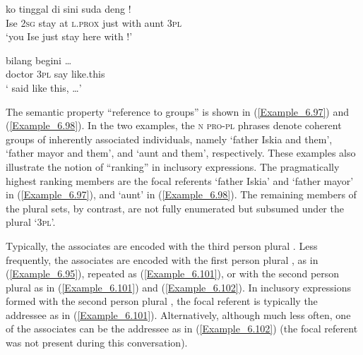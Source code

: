 \ea
\label{Example_6.98}
 {ko} {tinggal} {di} {sini} {suda} {deng} {} {!}\\ %
 Ise  \textsc{2sg}  stay  at  \textsc{l.prox}  just  with  aunt  \textsc{3pl}\\

\glt
‘you Ise just stay here with !’ \textstyleExampleSource{[080917-008-NP.0026]}
\z

\ea
\label{Example_6.99}
 {} {bilang} {begini} {\ldots}\\ %
 doctor  \textsc{3pl}  say  like.this  \\

\glt
‘ said like this, {\ldots}’ \textstyleExampleSource{[081015-005-NP.0047]}
\z


The semantic property “reference to groups” is shown in (\ref{Example_6.97}) and (\ref{Example_6.98}). In the two examples, the \textsc{n} \textsc{pro-pl}  phrases denote coherent groups of inherently associated individuals, namely  ‘father Iskia and them’,  ‘father mayor and them’, and  ‘aunt and them’, respectively. These examples also illustrate the notion of “ranking” in  inclusory expressions. The pragmatically highest ranking members are the focal referents  ‘father Iskia’ and  ‘father mayor’ in (\ref{Example_6.97}), and  ‘aunt’ in (\ref{Example_6.98}). The remaining members of the plural sets, by contrast, are not fully enumerated but subsumed under the plural   ‘3\textsc{pl}’.



Typically, the associates are encoded with the third person plural . Less frequently, the associates are encoded with the first person plural , as in (\ref{Example_6.95}), repeated as (\ref{Example_6.101}), or with the second person plural  as in (\ref{Example_6.101}) and (\ref{Example_6.102}). In  inclusory expressions formed with the second person plural , the focal referent is typically the addressee as in (\ref{Example_6.101}). Alternatively, although much less often, one of the associates can be the addressee as in (\ref{Example_6.102}) (the focal referent  was not present during this conversation).

